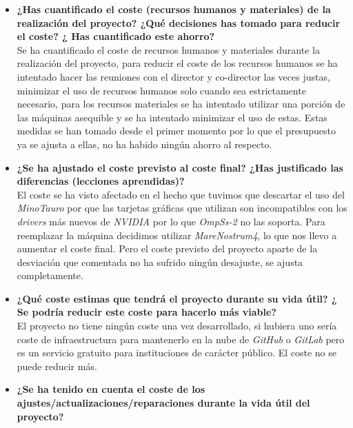 \begin{itemize}
	
	\item \textbf{\textbf{¿Has cuantificado el coste (recursos humanos y materiales) de la realización del proyecto? ¿Qué decisiones has tomado para reducir el coste? ¿ Has cuantificado este ahorro?}} \\
	
	Se ha cuantificado el coste de recursos humanos y materiales durante la realización del proyecto, para reducir el coste de los recursos humanos se ha intentado hacer las reuniones con el director y co-director las veces justas, minimizar el uso de recursos humanos solo cuando sea estrictamente necesario, para los recursos materiales se ha intentado utilizar una porción de las máquinas asequible y se ha intentado minimizar el uso de estas. Estas medidas se han tomado desde el primer momento por lo que el presupuesto ya se ajusta a ellas, no ha habido ningún ahorro al respecto.
	
	\item \textbf{¿Se ha ajustado el coste previsto al coste final? ¿Has justificado las diferencias (lecciones aprendidas)?} \\
	
	El coste se ha visto afectado en el hecho que tuvimos que descartar el uso del \textit{MinoTauro} por que las tarjetas gráficas que utilizan son incompatibles con los \textit{drivers} más nuevos de \textit{NVIDIA} por lo que \textit{OmpSs-2} no las soporta. Para reemplazar la máquina decidimos utilizar \textit{MareNostrum4}, lo que nos llevo a aumentar el coste final. Pero el coste previsto del proyecto aparte de la desviación que comentada no ha sufrido ningún desajuste, se ajusta completamente.
	
	\item \textbf{¿Qué coste estimas que tendrá el proyecto durante su vida útil? ¿ Se podría reducir este
		coste para hacerlo más viable?} \\
	
	El proyecto no tiene ningún coste una vez desarrollado, si hubiera uno sería coste de infraestructura para mantenerlo en la nube de \textit{GitHub} o \textit{GitLab} pero es un servicio gratuito para instituciones de carácter público. El coste no se puede reducir más.
	
	\item \textbf{¿Se ha tenido en cuenta el coste de los ajustes/actualizaciones/reparaciones durante la
		vida útil del proyecto?} \\
	

\end{itemize}
